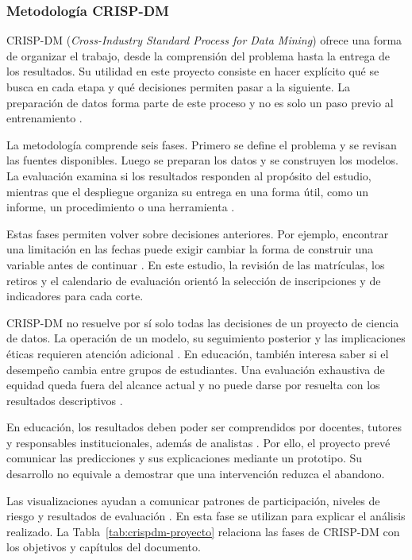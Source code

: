 \subsubsection{Metodología CRISP-DM}

CRISP-DM (\textit{Cross-Industry Standard Process for Data Mining}) ofrece una forma de organizar el trabajo, desde la comprensión del problema hasta la entrega de los resultados. Su utilidad en este proyecto consiste en hacer explícito qué se busca en cada etapa y qué decisiones permiten pasar a la siguiente. La preparación de datos forma parte de este proceso y no es solo un paso previo al entrenamiento \cite{fayyad1996,chapman2000,wirth2000}.

La metodología comprende seis fases. Primero se define el problema y se revisan las fuentes disponibles. Luego se preparan los datos y se construyen los modelos. La evaluación examina si los resultados responden al propósito del estudio, mientras que el despliegue organiza su entrega en una forma útil, como un informe, un procedimiento o una herramienta \cite{chapman2000,shearer2000}.

Estas fases permiten volver sobre decisiones anteriores. Por ejemplo, encontrar una limitación en las fechas puede exigir cambiar la forma de construir una variable antes de continuar \cite{chapman2000}. En este estudio, la revisión de las matrículas, los retiros y el calendario de evaluación orientó la selección de inscripciones y de indicadores para cada corte.

CRISP-DM no resuelve por sí solo todas las decisiones de un proyecto de ciencia de datos. La operación de un modelo, su seguimiento posterior y las implicaciones éticas requieren atención adicional \cite{martinezplumed2021}. En educación, también interesa saber si el desempeño cambia entre grupos de estudiantes. Una evaluación exhaustiva de equidad queda fuera del alcance actual y no puede darse por resuelta con los resultados descriptivos \cite{zenodo8115786}.

En educación, los resultados deben poder ser comprendidos por docentes, tutores y responsables institucionales, además de analistas \cite{romeroventura2020,educsci11090552}. Por ello, el proyecto prevé comunicar las predicciones y sus explicaciones mediante un prototipo. Su desarrollo no equivale a demostrar que una intervención reduzca el abandono.

Las visualizaciones ayudan a comunicar patrones de participación, niveles de riesgo y resultados de evaluación \cite{info16040326}. En esta fase se utilizan para explicar el análisis realizado. La Tabla~\ref{tab:crispdm-proyecto} relaciona las fases de CRISP-DM con los objetivos y capítulos del documento.

